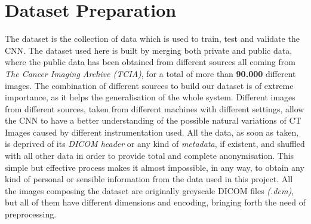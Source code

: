 \documentclass[../main.tex]{subfiles}
\begin{document}
\section{Dataset Preparation}
The dataset is the collection of data which is used to train, test and validate the CNN. The dataset used here is built by merging both private and public data, where the public data has been obtained from different sources all coming from \textit{The Cancer Imaging Archive (TCIA)}, for a total of more than \textbf{90.000} different images. The combination of different sources to build our dataset is of extreme importance, as it helps the generalisation of the whole system. Different images from different sources, taken from different machines with different settings, allow the CNN to have a better understanding of the possible natural variations of CT Images caused by different instrumentation used. All the data, as soon as taken, is deprived of its \textit{DICOM header} or any kind of \textit{metadata}, if existent, and shuffled with all other data in order to provide total and complete anonymisation. This simple but effective process makes it almost impossible, in any way, to obtain any kind of personal or sensible information from the data used in this project.
All the images composing the dataset are originally greyscale DICOM files \textit{(.dcm)}, but all of them have different dimensions and encoding, bringing forth the need of preprocessing.
\vspace{5mm}
\end{document}
